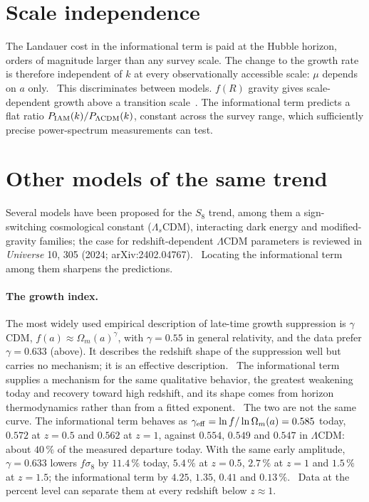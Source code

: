 \section{Scale independence}
The Landauer cost in the informational term is paid at the Hubble horizon, orders of magnitude larger than any survey scale. The change to the growth
rate is therefore independent of $k$ at every observationally accessible scale: $\mu$ depends on $a$ only. \interp\ This discriminates between
models. $f(R)$ gravity gives scale-dependent growth above a transition scale~\cite{PogosianSilvestri2008}. The informational term predicts a flat ratio
$P_{\rm IAM}(k)/P_{\Lambda\rm CDM}(k)$, constant across the survey range, which sufficiently precise power-spectrum measurements can test. \prediction

\section{Other models of the same trend}
Several models have been proposed for the $S_8$ trend, among them a sign-switching cosmological constant ($\Lambda_s$CDM), interacting dark energy
and modified-gravity families; the case for redshift-dependent $\Lambda$CDM parameters is reviewed in \emph{Universe} 10, 305 (2024;
arXiv:\allowbreak{}2402.04767). \observed\ Locating the informational term among them sharpens the predictions.

\paragraph{The growth index.} The most widely used empirical description of late-time growth suppression is $\gamma$CDM, $f(a)\approx\Omega_m(a)^\gamma$,
with $\gamma=0.55$ in general relativity, and the data prefer $\gamma=0.633$ (above). It describes the redshift shape of the suppression well but
carries no mechanism; it is an effective description. \interp\ The informational term supplies a mechanism for the same qualitative behavior, the
greatest weakening today and recovery toward high redshift, and its shape comes from horizon thermodynamics rather than from a fitted exponent.
\interp\ The two are not the same curve. The informational term behaves as $\gamma_{\rm eff}=\ln f/\ln\Omega_m(a)=0.585$ today, $0.572$ at $z=0.5$ and
$0.562$ at $z=1$, against $0.554$, $0.549$ and $0.547$ in $\Lambda$CDM: about $40\,\%$ of the measured departure today. With the same early
amplitude, $\gamma=0.633$ lowers $f\sigma_8$ by $11.4\,\%$ today, $5.4\,\%$ at $z=0.5$, $2.7\,\%$ at $z=1$ and $1.5\,\%$ at $z=1.5$; the informational
term by $4.25$, $1.35$, $0.41$ and $0.13\,\%$. \calc\ Data at the percent level can separate them at every redshift below $z\approx1$.

